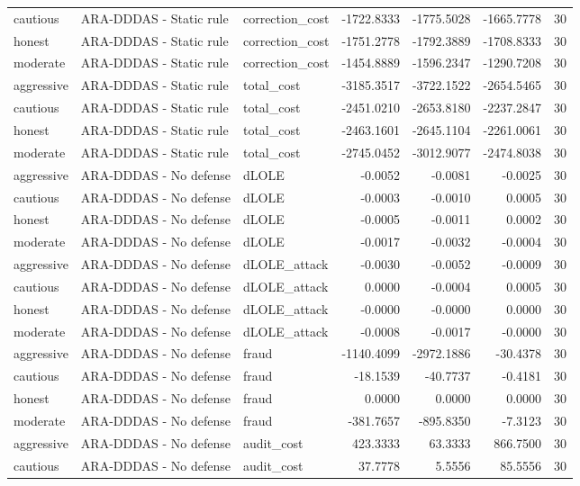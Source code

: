 \begin{tabular}{lllrrrr}
cautious & ARA-DDDAS - Static rule & correction_cost & -1722.8333 & -1775.5028 & -1665.7778 & 30 \\
honest & ARA-DDDAS - Static rule & correction_cost & -1751.2778 & -1792.3889 & -1708.8333 & 30 \\
moderate & ARA-DDDAS - Static rule & correction_cost & -1454.8889 & -1596.2347 & -1290.7208 & 30 \\
aggressive & ARA-DDDAS - Static rule & total_cost & -3185.3517 & -3722.1522 & -2654.5465 & 30 \\
cautious & ARA-DDDAS - Static rule & total_cost & -2451.0210 & -2653.8180 & -2237.2847 & 30 \\
honest & ARA-DDDAS - Static rule & total_cost & -2463.1601 & -2645.1104 & -2261.0061 & 30 \\
moderate & ARA-DDDAS - Static rule & total_cost & -2745.0452 & -3012.9077 & -2474.8038 & 30 \\
aggressive & ARA-DDDAS - No defense & dLOLE & -0.0052 & -0.0081 & -0.0025 & 30 \\
cautious & ARA-DDDAS - No defense & dLOLE & -0.0003 & -0.0010 & 0.0005 & 30 \\
honest & ARA-DDDAS - No defense & dLOLE & -0.0005 & -0.0011 & 0.0002 & 30 \\
moderate & ARA-DDDAS - No defense & dLOLE & -0.0017 & -0.0032 & -0.0004 & 30 \\
aggressive & ARA-DDDAS - No defense & dLOLE_attack & -0.0030 & -0.0052 & -0.0009 & 30 \\
cautious & ARA-DDDAS - No defense & dLOLE_attack & 0.0000 & -0.0004 & 0.0005 & 30 \\
honest & ARA-DDDAS - No defense & dLOLE_attack & -0.0000 & -0.0000 & 0.0000 & 30 \\
moderate & ARA-DDDAS - No defense & dLOLE_attack & -0.0008 & -0.0017 & -0.0000 & 30 \\
aggressive & ARA-DDDAS - No defense & fraud & -1140.4099 & -2972.1886 & -30.4378 & 30 \\
cautious & ARA-DDDAS - No defense & fraud & -18.1539 & -40.7737 & -0.4181 & 30 \\
honest & ARA-DDDAS - No defense & fraud & 0.0000 & 0.0000 & 0.0000 & 30 \\
moderate & ARA-DDDAS - No defense & fraud & -381.7657 & -895.8350 & -7.3123 & 30 \\
aggressive & ARA-DDDAS - No defense & audit_cost & 423.3333 & 63.3333 & 866.7500 & 30 \\
cautious & ARA-DDDAS - No defense & audit_cost & 37.7778 & 5.5556 & 85.5556 & 30 \\

\end{tabular}

